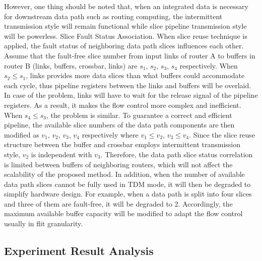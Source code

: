 However, one thing should be noted that, when an integrated data is necessary for downstream data path such as routing computing, the intermittent transmission style will remain functional while slice pipeline transmission style will be powerless. Slice Fault Status Association. When slice reuse technique is applied, the fault status of neighboring data path slices influences each other. Assume that the fault-free slice number from input links of router A to buffers in router B (links, buffers, crossbar, links) are $s_1$, $s_2$, $s_3$, $s_4$ respectively. When $s_{2} \leq s_{1}$, links provides more data slices than what buffers could accommodate each cycle, thus pipeline registers between the links and buffers will be overlaid. In case of the problem, links will have to wait for the release signal of the pipeline registers. As a result, it makes the flow control more complex and inefficient. When $s_{4} \leq s_{3}$, the problem is similar. To guarantee a correct and efficient pipeline, the available slice numbers of the data path components are then modified as $v_1$, $v_2$, $v_3$, $v_4$ respectively where $v_{1} \leq v_{2}$, $v_{3} \leq v_{4}$. Since the slice reuse structure between the buffer and crossbar employs intermittent transmission style, $v_2$ is independent with $v_3$. Therefore, the data path slice status correlation is limited between buffers of neighboring routers, which will not affect the scalability of the proposed method. In addition, when the number of available data path slices cannot be fully used in TDM mode, it will then be degraded to simplify hardware design. For example, when a data path is split into four slices and three of them are fault-free, it will be degraded to 2. Accordingly, the maximum available buffer capacity will be modified to adapt the flow control usually in flit granularity.

\subsection{Experiment Result Analysis}

